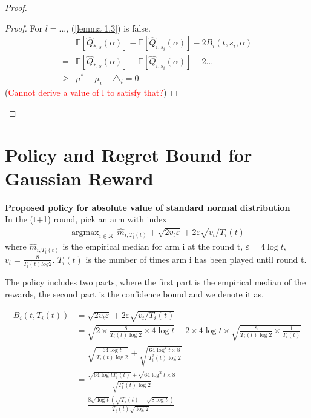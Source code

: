 \documentclass{article}
\DeclareMathOperator*{\argmax}{argmax}
\theoremstyle{plain}
\begin{document}
\begin{proof}
\begin{proof}
    For $l = ...$, (\ref{lemma 1.3}) is false.
    \begin{align}
        & \mathbb{E}[\hat{Q}_{*, s}(\alpha)] - \mathbb{E}[\hat{Q}_{i, s_i}(\alpha)] - 2 B_i(t, s_i, \alpha) \\
        = &\mathbb{E}[\hat{Q}_{*, s}(\alpha)] - \mathbb{E}[\hat{Q}_{i, s_i}(\alpha)] - 2 ... \\
        \geq & \mu^\ast - \mu_i - \triangle_i = 0
    \end{align}
    (\textcolor{red}{Cannot derive a value of l to satisfy that?})
\end{proof}

\end{proof}


\section{Policy and Regret Bound for Gaussian Reward}

\textbf{Proposed policy for absolute value of standard normal distribution}\\
In the (t+1) round, pick an arm with index
\begin{align}
\label{policy normal}
   \argmax_{i \in \mathcal{K}} \hat{m}_{i, T_i(t)} + \sqrt{2v_t \varepsilon} + 2 \varepsilon \sqrt{v_t/T_i(t)}
\end{align}
where $\hat{m}_{i, T_i(t)}$ is the empirical median for arm i at the round t, $\varepsilon = 4 \log t$, $v_t = \frac{8}{T_i(t) log2}$. $T_i(t)$ is the number of times arm i has been played until round t.

The policy includes two parts, where the first part is the empirical median of the rewards, the second part is the confidence bound and we denote it as,

\begin{align}
\label{B_i(i, T_i(t)) definition}
B_i(t, T_i(t)) &= \sqrt{2v_t \varepsilon} + 2 \varepsilon \sqrt{v_t/T_i(t)}\\
&= \sqrt{2 \times \frac{8}{T_i(t) \log 2} \times 4 \log t} + 2 \times 4 \log t \times \sqrt{\frac{8}{T_i(t) \log 2} \times \frac{1}{T_i(t)}}\\
&= \sqrt{\frac{64 \log t}{T_i(t) \log 2}} + \sqrt{\frac{64 \log^2 t \times 8}{T_i^2(t) \log 2}}\\
&= \frac{\sqrt{64 \log t T_i(t)} + \sqrt{64 \log^2 t \times 8}}{\sqrt{T_i^2(t) \log 2}}\\
\label{B_i(i, T_i(t)) definition 2}
&= \frac{8 \sqrt{\log t} (\sqrt{ T_i(t)} + \sqrt{8\log t})}{T_i(t)  \sqrt{\log 2}}
\end{align}
\end{document}
